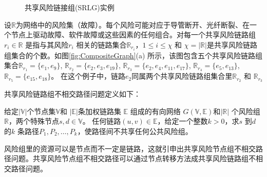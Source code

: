 \begin{figure}[htbp]
\centering
{}
\caption{共享风险链接组(SRLG)实例}\label{fig:SRLGgraph}
\label{fig:Logic shift operation}
\end{figure}

设$\mathbb{R}$为网络中的风险集（故障）。每个风险可能对应于导管断开、光纤断裂、在一个节点上驱动故障、软件故障或这些因素的任何组合。对每一个共享风险链路组$r_i \in \mathbb{R}$ 是指与其风险$r_i$ 相关的链路集合$\mathbb{R}_{r_i}$，$1\leq i\leq \chi$ 和 $\chi=|{\mathbb{R}}|$是共享风险链路组集合的个数。如图\ref{fig:CompositeGraph}(a) 所示，该图包含五个共享风险链路组集合$\mathbb{R}_{r_1}=\{e_1,e_9\}$, $\mathbb{R}_{r_2}=\{e_2,e_3,e_{19}\}$, $\mathbb{R}_{r_3}=\{e_2,e_4,e_{11},e_{17}\}$, $\mathbb{R}_{r_4}=\{e_5,e_{13}\}$, $\mathbb{R}_{r_5}=\{e_{15},e_{18}\}$。 在这个例子中，链路$e_2$同属两个共享风险链路组集合里$\mathbb{R}_{r_2}$ 和 $\mathbb{R}_{r_3}$





共享风险链路组不相交路径问题定义如下：

\begin{definition}[共享风险链路组不相交路径问题]
给定$|\mathbb{V}|$个节点集$\mathbb{V}$和 $|\mathbb{E}|$条加权链路集 $\mathbb{E}$ 组成的有向网络 $G(\mathbb{V},\mathbb{E})$和$|\mathbb{R}|$ 个风险组$\mathbb{R}$，两个特殊节点$s,d\in\mathbb{V}$。 任何链路$(u,v)\in\mathbb{E}$，给定一个整数$k>0$，求$s$ 到$d$ 的$k$ 条路径$P_1,P_2,\ldots,P_k$，使路径间不共享任何公共风险组。
\end{definition}
风险组里的资源可以是节点而不一定是链路，这就引申出共享风险节点组不相交路径问题。共享风险节点组不相交路径可以通过节点转移方法成共享风险链路组不相交路径问题。

